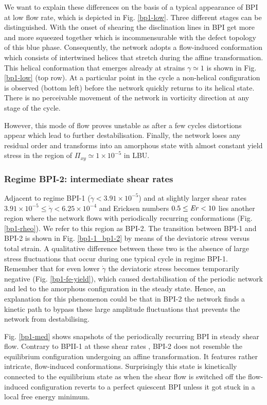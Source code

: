 \documentclass[aps,pre,reprint,superscriptaddress, twocolumn]{revtex4}
\newcommand{\e}[1]{\times10^{#1}}
\newcommand{\gd}{\dot{\gamma}}
\begin{document}
We want to explain these differences on the basis of a typical 
appearance of BPI at low flow rate, which is depicted in Fig. \ref{bp1-low}.
Three different stages can be distinguished. 
With the onset of shearing the disclination lines 
in BPI get more and more squeezed together which is incommensurable with 
the defect topology of this blue phase. 
Consequently, the network adopts a flow-induced conformation which consists 
of intertwined helices that stretch during the affine transformation.
This helical conformation that emerges already at strains $\gamma\simeq1$ 
is shown in Fig. \ref{bp1-low} (top row).
At a particular point in the cycle a non-helical configuration is
observed (bottom left) before the network quickly returns
to its helical state. There is no perceivable movement of the 
network in vorticity direction at any stage of the cycle.

However, this mode of flow proves unstable as after a few cycles 
distortions appear which lead to further destabilisation.
Finally, the network loses any residual order and 
transforms into an amorphous state with almost constant
yield stress in the region of $\Pi_{xy}\simeq 1\e{-5}$ in LBU.

\subsubsection{Regime BPI-2: intermediate shear rates}

Adjacent to regime BPI-1 ($\gd<3.91\e{-5}$) and 
at slightly larger shear rates $3.91\e{-5}\le\gd< 6.25\e{-4}$
and Ericksen numbers $0.5\le{\it Er}<10$ 
lies another region where the network flows with periodically 
recurring conformations (Fig. \ref{bp1-rheo}). 
We refer to this region as BPI-2. The transition between BPI-1 and BPI-2 
is shown in Fig. \ref{bp1-1_bp1-2} by means of the deviatoric stress versus total strain. 
A qualitative difference between these two is the absence of 
large stress fluctuations that occur during one typical cycle in regime BPI-1.
Remember that for even lower $\gd$ the deviatoric stress becomes 
temporarily negative (Fig. \ref{bp1-fe-yield}), which 
caused destabilisation of the periodic network and led to the 
amorphous configuration in the steady state. Hence, an explanation 
for this phenomenon could be that in BPI-2 the network finds a 
kinetic path to bypass these large amplitude fluctuations that 
prevents the network from destabilising.

Fig. \ref{bp1-med} shows snapshots of the periodically recurring 
BPI in steady shear flow. Contrary to BPII-1 at these shear rates
, BPI-2 does not resemble the equilibrium configuration
undergoing an affine transformation. It features rather intricate, flow-induced 
conformations. Surprisingly this state is kinetically connected to the equilibrium 
state as when the shear flow is switched off the flow-induced configuration 
reverts to a perfect quiescent BPI unless it got stuck in a local free energy 
minimum. 
\end{document}

